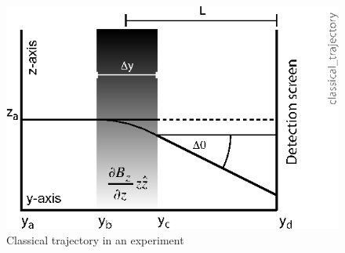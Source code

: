 \documentclass[aps,prl,superscriptaddress,12pt]{revtex4-2}
\begin{document}
\begin{figure}
\includegraphics{classical_trajectory_small.eps}
\caption{\label{fig:classical:trajectory} {Classical trajectory in an \sg experiment}}
\end{figure}
\end{document}
